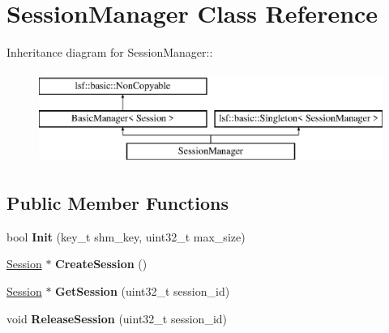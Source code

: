 \hypertarget{classSessionManager}{
\section{SessionManager Class Reference}
\label{classSessionManager}
}
Inheritance diagram for SessionManager::\begin{figure}[H]
\begin{center}
\leavevmode
\includegraphics[height=3cm]{classSessionManager}
\end{center}
\end{figure}
\subsection*{Public Member Functions}
\begin{DoxyCompactItemize}
\item 
\hypertarget{classSessionManager_a611e1e7c2ef141e7d7dca353686094b2}{
bool {\bfseries Init} (key\_\-t shm\_\-key, uint32\_\-t max\_\-size)}
\label{classSessionManager_a611e1e7c2ef141e7d7dca353686094b2}

\item 
\hypertarget{classSessionManager_a59b561b3b601d1504d273e41bd83ceca}{
\hyperlink{classSession}{Session} $\ast$ {\bfseries CreateSession} ()}
\label{classSessionManager_a59b561b3b601d1504d273e41bd83ceca}

\item 
\hypertarget{classSessionManager_a8812315191f8501f898bba5545de0535}{
\hyperlink{classSession}{Session} $\ast$ {\bfseries GetSession} (uint32\_\-t session\_\-id)}
\label{classSessionManager_a8812315191f8501f898bba5545de0535}

\item 
\hypertarget{classSessionManager_a6a57811fa8978e3356fad4822224a224}{
void {\bfseries ReleaseSession} (uint32\_\-t session\_\-id)}
\label{classSessionManager_a6a57811fa8978e3356fad4822224a224}

\end{DoxyCompactItemize}
